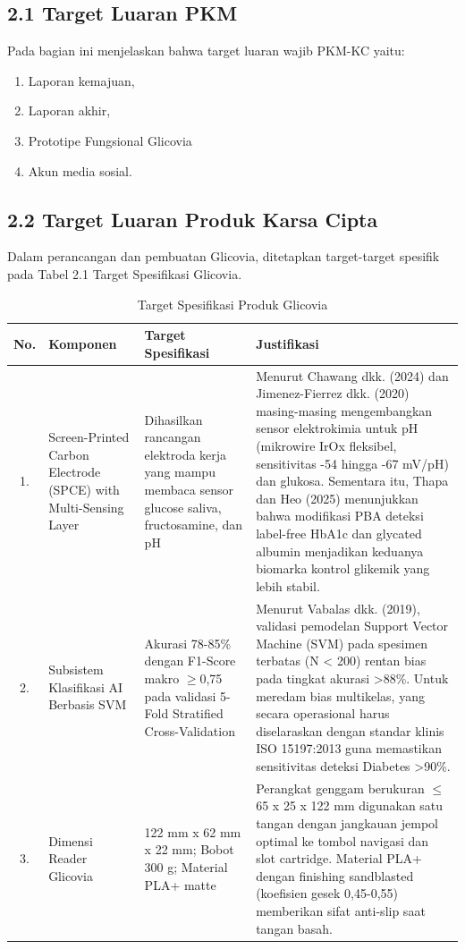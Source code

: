 \documentclass[12pt,a4paper]{article}
\begin{document}
\subsection*{2.1 Target Luaran PKM}
Pada bagian ini menjelaskan bahwa target luaran wajib PKM-KC yaitu:
\begin{enumerate}
    \item Laporan kemajuan,
    \item Laporan akhir,
    \item Prototipe Fungsional Glicovia
    \item Akun media sosial.
\end{enumerate}

\subsection*{2.2 Target Luaran Produk Karsa Cipta}
Dalam perancangan dan pembuatan Glicovia, ditetapkan target-target spesifik pada Tabel 2.1 Target Spesifikasi Glicovia.

\begin{table}[htbp]
\centering
\caption{Target Spesifikasi Produk Glicovia}
\label{tab:target_spesifikasi}
\begin{tabularx}{\textwidth}{|c|X|X|X|}
\hline
\textbf{No.} & \textbf{Komponen} & \textbf{Target Spesifikasi} & \textbf{Justifikasi} \\ \hline
1. & Screen-Printed Carbon Electrode (SPCE) with Multi-Sensing Layer & Dihasilkan rancangan elektroda kerja yang mampu membaca sensor glucose saliva, fructosamine, dan pH & Menurut Chawang dkk. (2024) dan Jimenez-Fierrez dkk. (2020) masing-masing mengembangkan sensor elektrokimia untuk pH (mikrowire IrOx fleksibel, sensitivitas -54 hingga -67 mV/pH) dan glukosa. Sementara itu, Thapa dan Heo (2025) menunjukkan bahwa modifikasi PBA deteksi label-free HbA1c dan glycated albumin menjadikan keduanya biomarka kontrol glikemik yang lebih stabil. \\ \hline
2. & Subsistem Klasifikasi AI Berbasis SVM & Akurasi 78-85\% dengan F1-Score makro $\ge$0,75 pada validasi 5-Fold Stratified Cross-Validation & Menurut Vabalas dkk. (2019), validasi pemodelan Support Vector Machine (SVM) pada spesimen terbatas (N < 200) rentan bias pada tingkat akurasi >88\%. Untuk meredam bias multikelas, yang secara operasional harus diselaraskan dengan standar klinis ISO 15197:2013 guna memastikan sensitivitas deteksi Diabetes >90\%. \\ \hline
3. & Dimensi Reader Glicovia & 122 mm x 62 mm x 22 mm; Bobot 300 g; Material PLA+ matte & Perangkat genggam berukuran $\le$65 x 25 x 122 mm digunakan satu tangan dengan jangkauan jempol optimal ke tombol navigasi dan slot cartridge. Material PLA+ dengan finishing sandblasted (koefisien gesek 0,45-0,55) memberikan sifat anti-slip saat tangan basah. \\ \hline
\end{tabularx}
\end{table}
\end{document}
